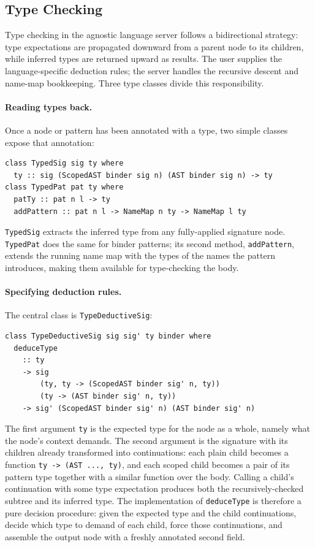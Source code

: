 \subsection{Type Checking}
\label{section:type_checking}

Type checking in the agnostic language server follows a bidirectional strategy: type expectations are propagated downward from a parent node to its children, while inferred types are returned upward as results.
The user supplies the language-specific deduction rules; the server handles the recursive descent and name-map bookkeeping.
Three type classes divide this responsibility.

\paragraph{Reading types back.}
Once a node or pattern has been annotated with a type, two simple classes expose that annotation:

\begin{verbatim}
class TypedSig sig ty where
  ty :: sig (ScopedAST binder sig n) (AST binder sig n) -> ty
class TypedPat pat ty where
  patTy :: pat n l -> ty
  addPattern :: pat n l -> NameMap n ty -> NameMap l ty
\end{verbatim}

\texttt{TypedSig} extracts the inferred type from any fully-applied signature node.
\texttt{TypedPat} does the same for binder patterns; its second method, \texttt{addPattern}, extends the running name map with the types of the names the pattern introduces, making them available for type-checking the body.

\paragraph{Specifying deduction rules.}
The central class is \texttt{TypeDeductiveSig}:

\begin{verbatim}
class TypeDeductiveSig sig sig' ty binder where
  deduceType
    :: ty
    -> sig
        (ty, ty -> (ScopedAST binder sig' n, ty))
        (ty -> (AST binder sig' n, ty))
    -> sig' (ScopedAST binder sig' n) (AST binder sig' n)
\end{verbatim}

The first argument \texttt{ty} is the expected type for the node as a whole, namely what the node's context demands.
The second argument is the signature with its children already transformed into continuations: each plain child becomes a function \texttt{ty -> (AST ..., ty)}, and each scoped child becomes a pair of its pattern type together with a similar function over the body.
Calling a child's continuation with some type expectation produces both the recursively-checked subtree and its inferred type.
The implementation of \texttt{deduceType} is therefore a pure decision procedure: given the expected type and the child continuations, decide which type to demand of each child, force those continuations, and assemble the output node with a freshly annotated second field.

